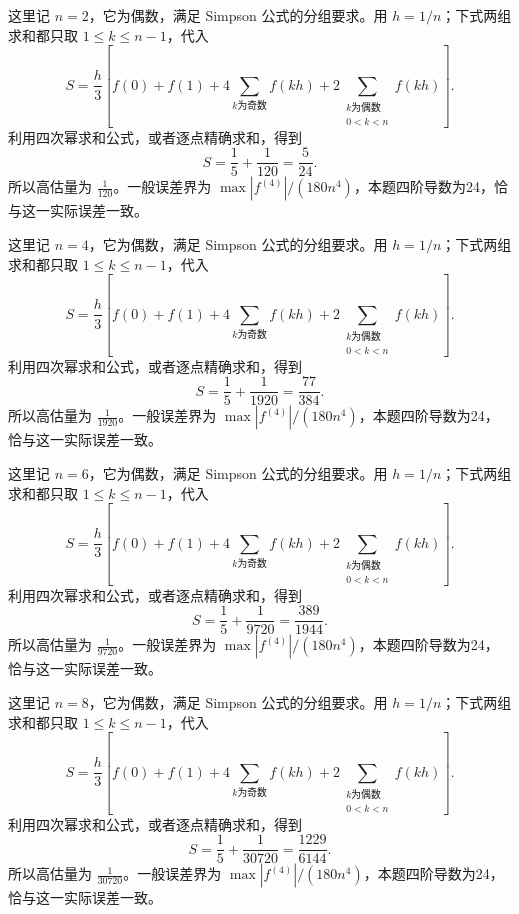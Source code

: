 \documentclass[UTF8,12pt,a4paper,fontset=fandol]{ctexart}
\begin{document}
\begin{solve}\label{ans:c18q7}
这里记 $n=2$，它为偶数，满足 Simpson 公式的分组要求。用 $h=1/n$；下式两组求和都只取 $1\le k\le n-1$，代入
\[
S=\frac h3\left[f(0)+f(1)+4\sum_{k\text{为奇数}}f(kh)+2\sum_{\substack{k\text{为偶数}\\0<k<n}}f(kh)\right].
\]
利用四次幂求和公式，或者逐点精确求和，得到
\[
S=\frac15+\frac{1}{120}=\frac{5}{24}.
\]
所以高估量为 $\frac{1}{120}$。一般误差界为 $\max|f^{(4)}|/(180n^4)$，本题四阶导数为24，恰与这一实际误差一致。
\end{solve}

\begin{solve}\label{ans:c18q8}
这里记 $n=4$，它为偶数，满足 Simpson 公式的分组要求。用 $h=1/n$；下式两组求和都只取 $1\le k\le n-1$，代入
\[
S=\frac h3\left[f(0)+f(1)+4\sum_{k\text{为奇数}}f(kh)+2\sum_{\substack{k\text{为偶数}\\0<k<n}}f(kh)\right].
\]
利用四次幂求和公式，或者逐点精确求和，得到
\[
S=\frac15+\frac{1}{1920}=\frac{77}{384}.
\]
所以高估量为 $\frac{1}{1920}$。一般误差界为 $\max|f^{(4)}|/(180n^4)$，本题四阶导数为24，恰与这一实际误差一致。
\end{solve}

\begin{solve}\label{ans:c18q9}
这里记 $n=6$，它为偶数，满足 Simpson 公式的分组要求。用 $h=1/n$；下式两组求和都只取 $1\le k\le n-1$，代入
\[
S=\frac h3\left[f(0)+f(1)+4\sum_{k\text{为奇数}}f(kh)+2\sum_{\substack{k\text{为偶数}\\0<k<n}}f(kh)\right].
\]
利用四次幂求和公式，或者逐点精确求和，得到
\[
S=\frac15+\frac{1}{9720}=\frac{389}{1944}.
\]
所以高估量为 $\frac{1}{9720}$。一般误差界为 $\max|f^{(4)}|/(180n^4)$，本题四阶导数为24，恰与这一实际误差一致。
\end{solve}

\begin{solve}\label{ans:c18q10}
这里记 $n=8$，它为偶数，满足 Simpson 公式的分组要求。用 $h=1/n$；下式两组求和都只取 $1\le k\le n-1$，代入
\[
S=\frac h3\left[f(0)+f(1)+4\sum_{k\text{为奇数}}f(kh)+2\sum_{\substack{k\text{为偶数}\\0<k<n}}f(kh)\right].
\]
利用四次幂求和公式，或者逐点精确求和，得到
\[
S=\frac15+\frac{1}{30720}=\frac{1229}{6144}.
\]
所以高估量为 $\frac{1}{30720}$。一般误差界为 $\max|f^{(4)}|/(180n^4)$，本题四阶导数为24，恰与这一实际误差一致。
\end{solve}
\end{document}
